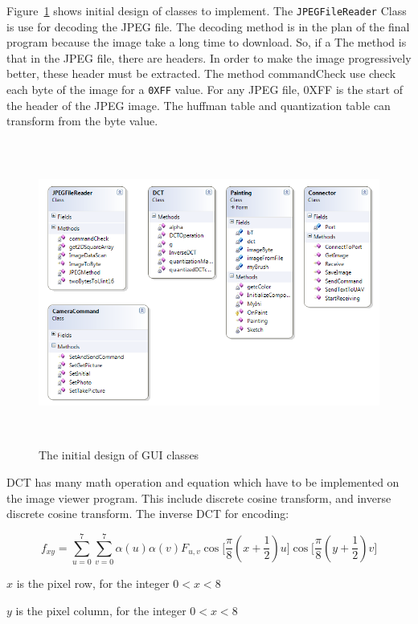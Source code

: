 \documentclass[oneside]{ecsgdp}         %
\begin{document}
Figure~\ref{ini_Class} shows initial design of classes to implement. The \texttt{JPEGFileReader} Class is use for decoding the JPEG file. The decoding method is in the plan of the final program because the image take a long time to download. So, if a  The method is that in the JPEG file, there are headers. In order to make the image progressively better, these header must be extracted. The method commandCheck use check each byte of the image for a \texttt{0XFF} value. For any JPEG file, 0XFF is the start of the header of the JPEG image. The huffman table and quantization table can transform from the byte value. 
\begin{center}
\begin{figure}[!hbtp]
\includegraphics[width=150mm,height=100mm]{initialClassDiagram.png} 
\caption{The initial design of GUI classes\label{ini_Class}}
\end{figure}
\end{center}
DCT has many math operation and equation which have to be implemented on the image viewer program. This include discrete cosine transform, and inverse discrete cosine transform. The inverse DCT for encoding:

\begin{equation}
f_{xy}=\sum_{u=0}^7\sum_{v=0}^7 \alpha(u) \alpha(v) F_{u,v} \cos\Big[\dfrac{\pi}{8}(x+\dfrac{1}{2})u\Big]\cos\Big[\dfrac{\pi}{8}(y+\dfrac{1}{2})v\Big]
\end{equation}

$x$ is the pixel row, for the integer $0< x< 8$

$y$ is the pixel column, for the integer $0< x< 8$
\end{document}
